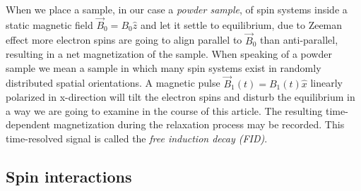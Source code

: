 \documentclass[11.5pt,a4paper]{article}
\begin{document}
When we place a sample, in our case a \emph{powder sample}, of spin systems inside a static magnetic field $\vec{B}_0 = B_0 \hat{z}$ and let it settle to equilibrium, due to Zeeman effect more electron spins are going to align parallel to $\vec{B}_0$ than anti-parallel, resulting in a net magnetization of the sample. When speaking of a powder sample we mean a sample in which many spin systems exist in randomly distributed spatial orientations. A magnetic pulse $\vec{B}_1(t) = B_1(t) \hat{x}$ linearly polarized in x-direction will tilt the electron spins and disturb the equilibrium in a way we are going to examine in the course of this article. The resulting time-dependent magnetization during the relaxation process may be recorded. This time-resolved signal is called the \emph{free induction decay (FID)}. 

\subsection{Spin interactions}
\end{document}
